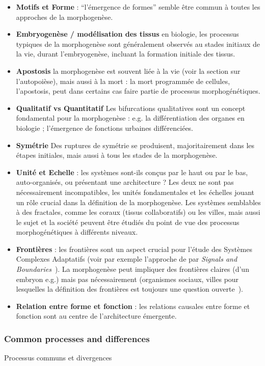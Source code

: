 {\begin{itemize}
\item \textbf{Motifs et Forme} : ``l'émergence de formes'' semble être commun à toutes les approches de la morphogenèse.
\item \textbf{Embryogenèse / modélisation des tissus} en biologie, les processus typiques de la morphogenèse sont généralement observés au stades initiaux de la vie, durant l'embryogenèse, incluant la formation initiale des tissus.
\item \textbf{Apostosis} la morphogenèse est souvent liée à la vie (voir la section sur l'autopoièse), mais aussi à la mort : la mort programmée de cellules, l'apostosis, peut dans certains cas faire partie de processus morphogénétiques.
\item \textbf{Qualitatif vs Quantitatif} Les bifurcations qualitatives sont un concept fondamental pour la morphogenèse : e.g. la différentiation des organes en biologie ; l'émergence de fonctions urbaines différenciées.
\item \textbf{Symétrie} Des ruptures de symétrie se produisent, majoritairement dans les étapes initiales, mais aussi à tous les stades de la morphogenèse.
\item \textbf{Unité et Echelle} : les systèmes sont-ils conçus par le haut ou par le bas, auto-organisés, ou présentant une architecture ? Les deux ne sont pas nécessairement incompatibles, les unités fondamentales et les échelles jouant un rôle crucial dans la définition de la morphogenèse. Les systèmes semblables à des fractales, comme les coraux (tissus collaboratifs) ou les villes, mais aussi le sujet et la société peuvent être étudiés du point de vue des processus morphogénétiques à différents niveaux.
\item \textbf{Frontières} : les frontières sont un aspect crucial pour l'étude des Systèmes Complexes Adaptatifs (voir par exemple l'approche de  par \emph{Signals and Boundaries}~\cite{holland2012signals}). La morphogenèse peut impliquer des frontières claires (d'un embryon e.g.) mais pas nécessairement (organismes sociaux, villes pour lesquelles la définition des frontières est toujours une question ouverte~\cite{2015arXiv150707878C}).
\item \textbf{Relation entre forme et fonction} : les relations causales entre forme et fonction sont au centre de l'architecture émergente.
\end{itemize}
}



\subsubsection{Common processes and differences}{Processus communs et divergences}


